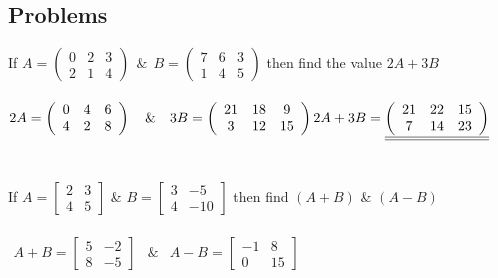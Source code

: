 \documentclass{article}
\begin{document}
	\subsection{Problems}
	If $ A = \left( \begin{array}{ccc}
			0 & 2 & 3 \\
			2 & 1 & 4
		\end{array}\right) ~~\& ~~ B = \left( \begin{array}{ccc}
		7 & 6 & 3 \\
		1 & 4 & 5
	\end{array}\right) $ then find the value $ 2A+3B $  \\ \\
	$ 2A = \left( \begin{array}{ccc}
		0 & 4 & 6 \\
		4 & 2 & 8
	\end{array}\right) ~~~\& ~~~ 3B = \left( \begin{array}{ccc}
		21 & 18 & 9 \\
		3 & 12 & 15
	\end{array}\right) \\
	2A+3B = \underline{\underline{\left( \begin{array}{ccc}
		21 & 22 & 15 \\
		7 & 14 & 23
	\end{array}\right)}}$
	\\ \\ \\
	If $ A= \left [ \begin{array}{cc} 
		2 & 3 \\ 4 & 5
	\end{array} \right ] $ \& $ B= \left[ \begin{array}{cc}
		3 & -5 \\ 4 & -10
	\end{array}\right]$ then find $ (A+B) $   \&   $ (A-B) $
	\\ \\
	$ \begin{array}{ccc}
			A+B= \left[ \begin{array}{cc}
			5 & -2 \\ 8 & -5
		\end{array}\right] & \& &
		A-B=\left[ \begin{array}{cc}
			-1 & 8 \\ 0 & 15
		\end{array}\right] 
	\end{array}$
	
\end{document}
